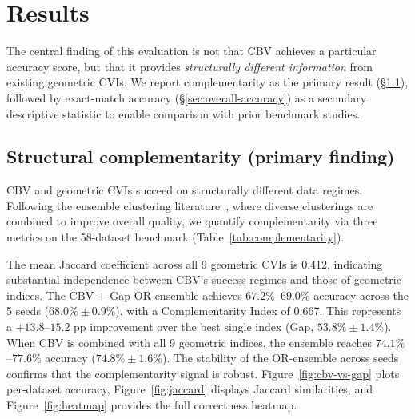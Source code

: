 \documentclass[journal]{IEEEtran}
\begin{document}
\section{Results}
\label{sec:results}

The central finding of this evaluation is not that CBV achieves a particular accuracy score, but that it provides \emph{structurally different information} from existing geometric CVIs. We report complementarity as the primary result (\S\ref{sec:complementarity}), followed by exact-match accuracy (\S\ref{sec:overall-accuracy}) as a secondary descriptive statistic to enable comparison with prior benchmark studies.

\subsection{Structural complementarity (primary finding)}
\label{sec:complementarity}

CBV and geometric CVIs succeed on structurally different data regimes. Following the ensemble clustering literature~\cite{strehl2003cluster, fred2005robust}, where diverse clusterings are combined to improve overall quality, we quantify complementarity via three metrics on the 58-dataset benchmark (Table~\ref{tab:complementarity}).

\begin{table}[t]
\centering
\caption{Complementarity Analysis (58 Datasets, Seed = 42)}
\label{tab:complementarity}
\end{table}

The mean Jaccard coefficient across all 9 geometric CVIs is 0.412, indicating substantial independence between CBV's success regimes and those of geometric indices. The CBV + Gap OR-ensemble achieves $67.2\%$--$69.0\%$ accuracy across the 5 seeds ($68.0\% \pm 0.9\%$), with a Complementarity Index of 0.667. This represents a $+13.8$--$15.2$ pp improvement over the best single index (Gap, $53.8\% \pm 1.4\%$). When CBV is combined with all 9 geometric indices, the ensemble reaches $74.1\%$--$77.6\%$ accuracy ($74.8\% \pm 1.6\%$). The stability of the OR-ensemble across seeds confirms that the complementarity signal is robust. Figure~\ref{fig:cbv-vs-gap} plots per-dataset accuracy, Figure~\ref{fig:jaccard} displays Jaccard similarities, and Figure~\ref{fig:heatmap} provides the full correctness heatmap.
\end{document}
